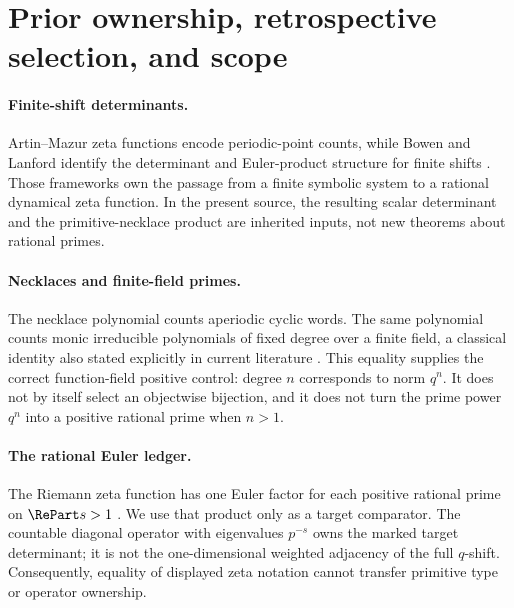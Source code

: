 \section{Prior ownership, retrospective selection, and scope}
\label{sec:prior-scope}

\paragraph{Finite-shift determinants.}
Artin--Mazur zeta functions encode periodic-point counts, while Bowen and
Lanford identify the determinant and Euler-product structure for finite
shifts \citep{artin1965periodic,bowen1970zeta}. Those
frameworks own the passage from a finite symbolic system to a rational
dynamical zeta function. In the present source, the resulting scalar
determinant and the primitive-necklace product are inherited inputs, not new
theorems about rational primes.

\paragraph{Necklaces and finite-field primes.}
The necklace polynomial counts aperiodic cyclic words. The same polynomial
counts monic irreducible polynomials of fixed degree over a finite field, a
classical identity also stated explicitly in current literature
\citep{chebolu2026necklace}. This equality supplies the correct
function-field positive control: degree $n$ corresponds to norm $q^n$. It
does not by itself select an objectwise bijection, and it does not turn the
prime power $q^n$ into a positive rational prime when $n>1$.

\paragraph{The rational Euler ledger.}
The Riemann zeta function has one Euler factor for each positive rational
prime on $\RePart s>1$ \citep{nistDLMF25211}. We use that product only as a
target comparator. The countable diagonal operator with eigenvalues $p^{-s}$
owns the marked target determinant; it is not the one-dimensional weighted
adjacency of the full $q$-shift. Consequently, equality of displayed zeta
notation cannot transfer primitive type or operator ownership.

